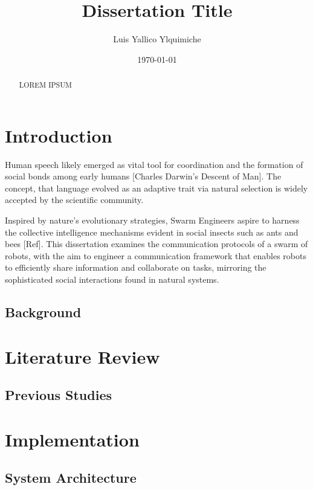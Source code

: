 \documentclass{report}
\title{Dissertation Title}
\author{Luis Yallico Ylquimiche}
\date{\today}
\begin{document}
\maketitle

\begin{abstract}
LOREM IPSUM
\end{abstract}

\tableofcontents

\chapter{Introduction}
Human speech likely emerged as vital tool for coordination and the formation of social bonds among early humans [Charles Darwin's Descent of Man]. The concept, that language evolved as an adaptive trait via natural selection is widely accepted by the scientific community. 

Inspired by nature's evolutionary strategies, Swarm Engineers aspire to harness the collective intelligence mechanisms evident in social insects such as ants and bees [Ref]. This dissertation examines the communication protocols of a swarm of robots, with the aim to engineer a communication framework that enables robots to efficiently share information and collaborate on tasks, mirroring the sophisticated social interactions found in natural systems.


\section{Background}
\lipsum[1-2] %

\chapter{Literature Review}
\section{Previous Studies}
\lipsum[3-4] %

\chapter{Implementation}

\section{System Architecture}
\end{document}
